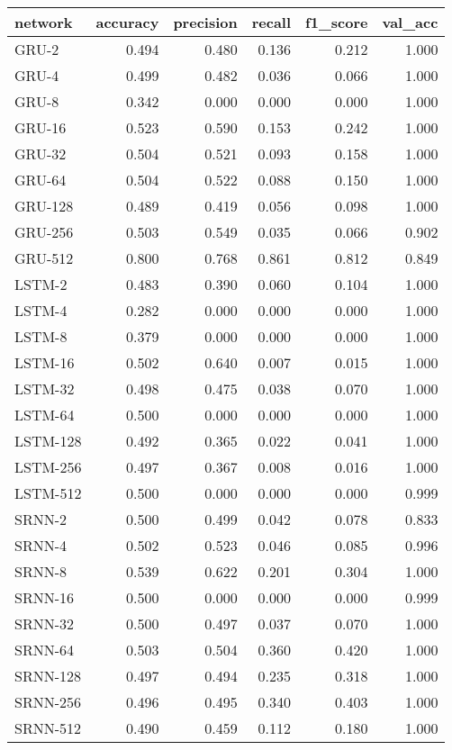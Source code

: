 \begin{tabular}{lrrrrr}
\toprule
  network &  accuracy &  precision &  recall &  f1\_score &  val\_acc \\
\midrule
    GRU-2 &     0.494 &      0.480 &   0.136 &     0.212 &    1.000 \\
    GRU-4 &     0.499 &      0.482 &   0.036 &     0.066 &    1.000 \\
    GRU-8 &     0.342 &      0.000 &   0.000 &     0.000 &    1.000 \\
   GRU-16 &     0.523 &      0.590 &   0.153 &     0.242 &    1.000 \\
   GRU-32 &     0.504 &      0.521 &   0.093 &     0.158 &    1.000 \\
   GRU-64 &     0.504 &      0.522 &   0.088 &     0.150 &    1.000 \\
  GRU-128 &     0.489 &      0.419 &   0.056 &     0.098 &    1.000 \\
  GRU-256 &     0.503 &      0.549 &   0.035 &     0.066 &    0.902 \\
  GRU-512 &     0.800 &      0.768 &   0.861 &     0.812 &    0.849 \\
   LSTM-2 &     0.483 &      0.390 &   0.060 &     0.104 &    1.000 \\
   LSTM-4 &     0.282 &      0.000 &   0.000 &     0.000 &    1.000 \\
   LSTM-8 &     0.379 &      0.000 &   0.000 &     0.000 &    1.000 \\
  LSTM-16 &     0.502 &      0.640 &   0.007 &     0.015 &    1.000 \\
  LSTM-32 &     0.498 &      0.475 &   0.038 &     0.070 &    1.000 \\
  LSTM-64 &     0.500 &      0.000 &   0.000 &     0.000 &    1.000 \\
 LSTM-128 &     0.492 &      0.365 &   0.022 &     0.041 &    1.000 \\
 LSTM-256 &     0.497 &      0.367 &   0.008 &     0.016 &    1.000 \\
 LSTM-512 &     0.500 &      0.000 &   0.000 &     0.000 &    0.999 \\
   SRNN-2 &     0.500 &      0.499 &   0.042 &     0.078 &    0.833 \\
   SRNN-4 &     0.502 &      0.523 &   0.046 &     0.085 &    0.996 \\
   SRNN-8 &     0.539 &      0.622 &   0.201 &     0.304 &    1.000 \\
  SRNN-16 &     0.500 &      0.000 &   0.000 &     0.000 &    0.999 \\
  SRNN-32 &     0.500 &      0.497 &   0.037 &     0.070 &    1.000 \\
  SRNN-64 &     0.503 &      0.504 &   0.360 &     0.420 &    1.000 \\
 SRNN-128 &     0.497 &      0.494 &   0.235 &     0.318 &    1.000 \\
 SRNN-256 &     0.496 &      0.495 &   0.340 &     0.403 &    1.000 \\
 SRNN-512 &     0.490 &      0.459 &   0.112 &     0.180 &    1.000 \\
\bottomrule
\end{tabular}
